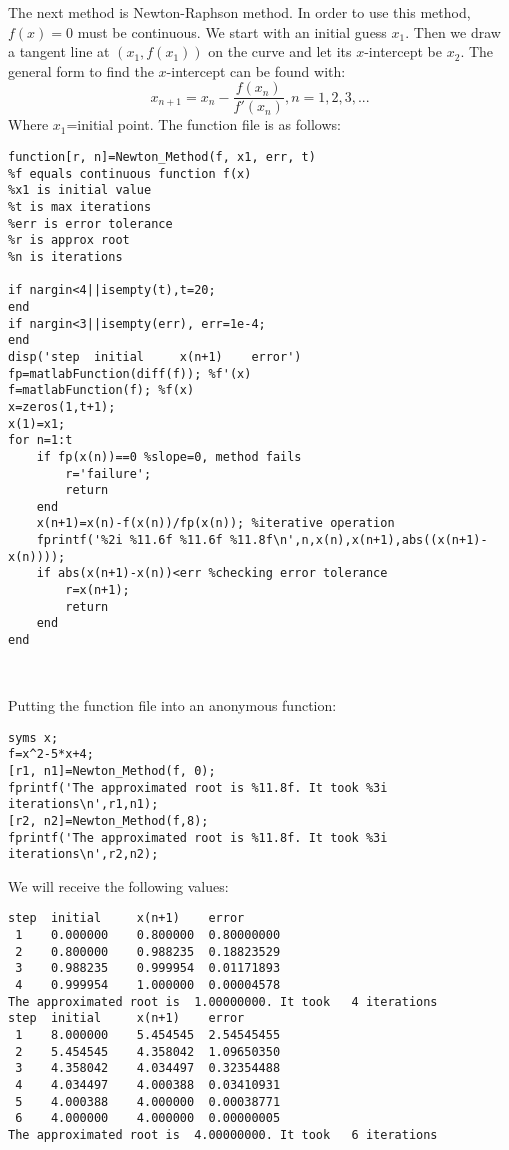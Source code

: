 \documentclass[12pt]{article}
\begin{document}

The next method is Newton-Raphson method. In order to use this method, $f(x)=0$ must be continuous. We start with an initial guess $x_{1}$. Then we draw a tangent line at $(x_{1},f(x_{1}))$ on the curve and let its $x$-intercept be $x_{2}$. The general form to find the $x$-intercept can be found with:
\begin{equation*}
x_{n+1}=x_{n}-\frac{f(x_{n})}{f'(x_{n})},n=1,2,3,...
\end{equation*}
Where $x_{1}$=initial point. The function file is as follows:
\begin{lstlisting}[style=Matlab-editor]
function[r, n]=Newton_Method(f, x1, err, t)
%f equals continuous function f(x)
%x1 is initial value
%t is max iterations
%err is error tolerance
%r is approx root
%n is iterations

if nargin<4||isempty(t),t=20;
end
if nargin<3||isempty(err), err=1e-4;
end
disp('step  initial     x(n+1)    error')
fp=matlabFunction(diff(f)); %f'(x)
f=matlabFunction(f); %f(x)
x=zeros(1,t+1);
x(1)=x1;
for n=1:t
    if fp(x(n))==0 %slope=0, method fails
        r='failure';
        return
    end
    x(n+1)=x(n)-f(x(n))/fp(x(n)); %iterative operation
    fprintf('%2i %11.6f %11.6f %11.8f\n',n,x(n),x(n+1),abs((x(n+1)-x(n))));
    if abs(x(n+1)-x(n))<err %checking error tolerance
        r=x(n+1);
        return
    end
end

    
\end{lstlisting}    
Putting the function file into an anonymous function:
\begin{lstlisting}[style=Matlab-editor]
syms x;
f=x^2-5*x+4;
[r1, n1]=Newton_Method(f, 0);
fprintf('The approximated root is %11.8f. It took %3i iterations\n',r1,n1);
[r2, n2]=Newton_Method(f,8);
fprintf('The approximated root is %11.8f. It took %3i iterations\n',r2,n2);
\end{lstlisting}
We will receive the following values:
\begin{lstlisting}[style=Matlab-editor]
step  initial     x(n+1)    error
 1    0.000000    0.800000  0.80000000
 2    0.800000    0.988235  0.18823529
 3    0.988235    0.999954  0.01171893
 4    0.999954    1.000000  0.00004578
The approximated root is  1.00000000. It took   4 iterations
step  initial     x(n+1)    error
 1    8.000000    5.454545  2.54545455
 2    5.454545    4.358042  1.09650350
 3    4.358042    4.034497  0.32354488
 4    4.034497    4.000388  0.03410931
 5    4.000388    4.000000  0.00038771
 6    4.000000    4.000000  0.00000005
The approximated root is  4.00000000. It took   6 iterations
\end{lstlisting}
\end{document}
